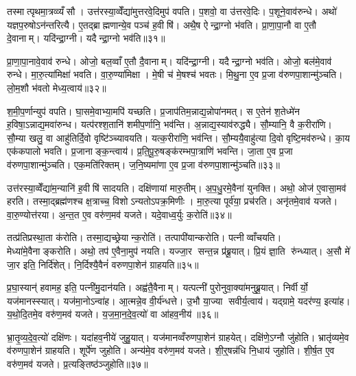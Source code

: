तस्मात्पृथमा॒त्रव्व्यँसौ। उत्त॑रस्या॒व्वेँद्या॑मुत्तरवे॒दिमुप॑ वपति। प॒शवो॒ वा उ॑त्तरवे॒दिः। प॒शूने॒वाव॑रुन्धे। अथो॑ यज्ञप॒रुषोऽन॑न्तरित्यै। ए॒तद्ब्राह्मणान्ये॒व पञ्च॑ ह॒वीषि॑। अथै॒ष ऐन्द्रा॒ग्नो भ॑वति। प्रा॒णा॒पा॒नौ वा ए॒तौ दे॒वानाम्। यदि॑न्द्रा॒ग्नी। यदैन्द्रा॒ग्नो भव॑ति॥३१॥

प्रा॒णा॒पा॒नावे॒वाव॑ रुन्धे। ओजो॒ बल॒व्वाँ ए॒तौ दै॒वानाम्। यदि॑न्द्रा॒ग्नी। यदैन्द्रा॒ग्नो भव॑ति। ओजो॒ बल॑मे॒वाव॑ रुन्धे। मा॒रु॒त्या॑मिक्षा॑ भवति। वा॒रु॒ण्या॑मिक्षा। मे॒षी च॑ मे॒षश्च॑ भवतः। मि॒थु॒ना ए॒व प्र॒जा व॑रुणपा॒शान्मु॑ञ्चति। लो॒म॒शौ भ॑वतो मेध्य॒त्वाय॑॥३२॥

श॒मी॒प॒र्णान्युप॑ वपति। घा॒समे॒वाभ्या॒मपि॑ यच्छति। प्र॒जाप॑तिम॒न्नाद्य॒न्नोपा॑नमत्। स ए॒तेन॑ श॒तेध्मे॑न ह॒विषा॒ऽन्नाद्य॒मवा॑रुन्ध। यत्प॑रश्श॒तानि॑ शमीप॒र्णानि॒ भव॑न्ति। अ॒न्नाद्य॒स्याव॑रुद्ध्यै। सौ॒म्यानि॒ वै क॒रीरा॑णि। सौ॒म्या खलु॒ वा आहु॑तिर्दि॒वो वृष्टि॑ञ्च्यावयति। यत्क॒रीरा॑णि॒ भव॑न्ति। सौ॒म्ययै॒वाहु॑त्या दि॒वो वृष्टि॒मव॑रुन्धे। का॒य एक॑कपालो भवति। प्र॒जानाङ्क॒न्त्वाय॑। प्र॒ति॒पू॒रु॒षङ्क॑रम्भपा॒त्राणि॑ भवन्ति। जा॒ता ए॒व प्र॒जा व॑रुणपा॒शान्मु॑ञ्चति। एक॒मति॑रिक्तम्। ज॒नि॒ष्यमा॑णा ए॒व प्र॒जा व॑रुणपा॒शान्मु॑ञ्चति॥३३॥\anuvakamend[नि॒रु॒प्यन्ते॑ भवतो॒ भव॑ति मेध्य॒त्वाय॑ रुन्धे॒ षट्च॑]

उत्त॑रस्या॒व्वेँद्या॑म॒न्यानि॑ ह॒वीषि॑ सादयति। दक्षि॑णायां मारु॒तीम्। अ॒प॒धु॒रमे॒वैना॑ युनक्ति। अथो॒ ओज॑ ए॒वासा॒मव॑ हरति। तस्मा॒द्ब्रह्म॑णश्च क्ष॒त्राच्च॒ विशोऽन्यतोऽपक्र॒मिणीः। मा॒रु॒त्या पूर्व॑या॒ प्रच॑रति। अनृ॑तमे॒वाव॑ यजते। वा॒रु॒ण्योत्त॑रया। अ॒न्त॒त ए॒व वरु॑ण॒मव॑ यजते। यदे॒वाध्व॒र्युः क॒रोति॑॥३४॥

तत्प्र॑तिप्रस्था॒ता क॑रोति। तस्मा॒द्यच्छ्रेयान्क॒रोति॑। तत्पापी॑यान्करोति। पत्नीव्वाँचयति। मेध्या॑मे॒वैनाङ्करोति। अथो॒ तप॑ ए॒वैना॒मुप॑ नयति। यज्जा॒र सन्त॒न्न प्र॑ब्रू॒यात्। प्रि॒यं ज्ञा॒ति रु॑न्ध्यात्। अ॒सौ मे॑ जा॒र इति॒ निर्दि॑शेत्। नि॒र्दिश्यै॒वैनं॑ वरुणपा॒शेन॑ ग्राहयति॥३५॥

प्र॒घा॒स्यान्॑ हवामह॒ इति॒ पत्नी॑मु॒दान॑यति। अह्व॑तै॒वैनाम्। यत्पत्नी॑ पुरोनुवा॒क्या॑मनुब्रू॒यात्। निर्वीर्यो॒ यज॑मानस्स्यात्। यज॑मा॒नोऽन्वा॑ह। आ॒त्मन्ने॒व वी॒र्य॑न्धत्ते। उ॒भौ या॒ज्या सवीर्य॒त्वाय॑। यद्ग्रामे॒ यदर॑ण्य॒ इत्या॑ह। य॒थो॒दि॒तमे॒व वरु॑ण॒मव॑ यजते। य॒ज॒मा॒न॒दे॒व॒त्यो॑ वा आ॑हव॒नीय॑॥३६॥

भ्रा॒तृ॒व्य॒दे॒व॒त्यो॑ दक्षि॑णः। यदा॑हव॒नीये॑ जुहु॒यात्। यज॑मानव्वँरुणपा॒शेन॑ ग्राहयेत्। दक्षि॑णे॒ऽग्नौ जु॑होति। भ्रातृ॑व्यमे॒व व॑रुणपा॒शेन॑ ग्राहयति। शूर्पे॑ण जुहोति। अन्य॑मे॒व वरु॑ण॒मव॑ यजते। शी॒र्॒षन्न॑धि नि॒धाय॑ जुहोति। शी॒र्\mbox{}ष॒त ए॒व वरु॑ण॒मव॑ यजते। प्र॒त्यङ्तिष्ठ॑ञ्जुहोति॥३७॥


